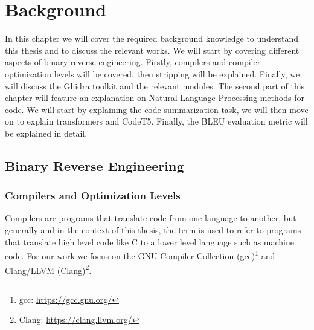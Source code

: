 \chapter{Background}
\label{background}



In this chapter we will cover the required background knowledge to understand this thesis and to discuss the relevant works. We will start by covering different aspects of binary reverse engineering. Firstly, compilers and compiler optimization levels will be covered, then stripping will be explained. Finally, we will discuss the Ghidra toolkit and the relevant modules. The second part of this chapter will feature an explanation on Natural Language Processing methods for code. We will start by explaining the code summarization task, we will then move on to explain transformers and CodeT5. Finally, the BLEU evaluation metric will be explained in detail.
\section{Binary Reverse Engineering}

\subsection{Compilers and Optimization Levels}
Compilers are programs that translate code from one language to another, but generally and in the context of this thesis, the term is used to refer to programs that translate high level code like C to a lower level language such as machine code. For our work we focus on the GNU Compiler Collection (gcc)\footnote{gcc: \url{https://gcc.gnu.org/}} and Clang/LLVM (Clang)\footnote{Clang: \url{https://clang.llvm.org/}}.

